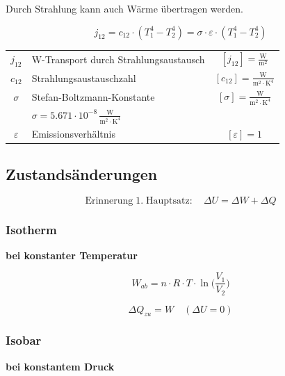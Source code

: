 Durch Strahlung kann auch Wärme übertragen werden.

$$ \boxed{ j_{12} = c_{12} \cdot (T_1^4 - T_2^4) = \sigma \cdot \varepsilon \cdot (T_1^4 - T_2^4) }   $$



\begin{tabular}{c l c}
	\rule{0pt}{10pt}$j_{12}$ & W-Transport durch Strahlungsaustausch & $[j_{12}] = \mathrm{\frac{W}{m^2}}$ \\
	\rule{0pt}{10pt}$c_{12}$ & Strahlungsaustauschzahl & $[c_{12}] = \mathrm{\frac{W}{m^2 \cdot K^4}}$ \\
	\rule{0pt}{10pt}$\sigma$ & Stefan-Boltzmann-Konstante  & $[\sigma] = \mathrm{\frac{W}{m^2 \cdot K^4}}$\\
	\rule{0pt}{10pt}&  $\sigma = 5.671 \cdot 10^{-8} \, \mathrm{\frac{W}{m^2 \cdot K^4}}$ &  \\
	\rule{0pt}{10pt}$\varepsilon$ & Emissionsverhältnis & $[\varepsilon] = 1$ \\
\end{tabular}








\subsection{Zustandsänderungen}

$$ \mathrm{Erinnerung \; 1. \; Hauptsatz}: \quad  \Delta U = \Delta W + \Delta Q $$


\subsubsection{Isotherm}
\textbf{bei konstanter Temperatur}

\begin{minipage}{0.48\linewidth}
$$ \boxed{ W_{ab} = n \cdot R \cdot T \cdot \ln \Big( \frac{V_1}{V_2}  \Big) }  $$
\end{minipage}
\hfill
\begin{minipage}{0.48\linewidth}
$$ \boxed{ \Delta Q_{zu} = W } \quad  (\Delta U = 0) $$
\end{minipage}



\subsubsection{Isobar}
\textbf{bei konstantem Druck} \\

